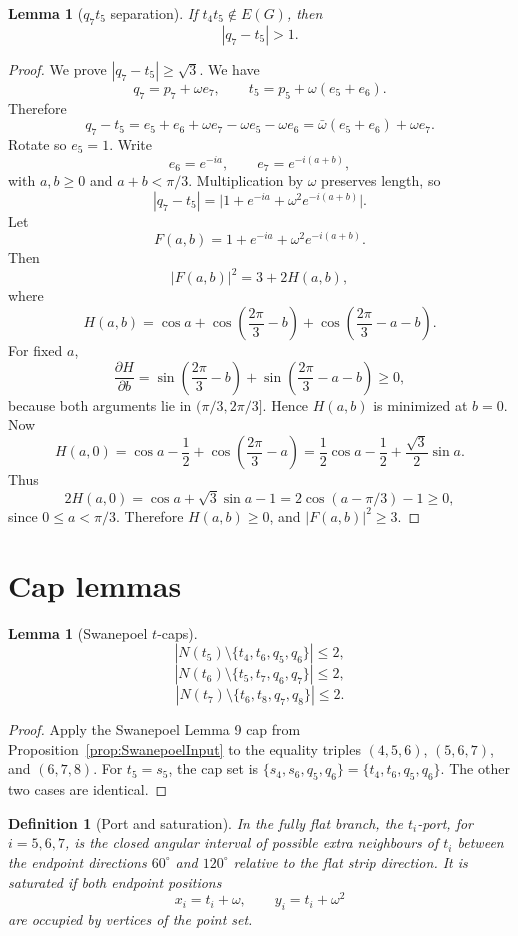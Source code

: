 \documentclass[11pt]{article}
\newtheorem{lemma}[theorem]{Lemma}
\newtheorem{definition}[theorem]{Definition}
\begin{document}
\begin{lemma}[$q_7t_5$ separation]\label{lem:q7t5}
If $t_4t_5\notin E(G)$, then
\[
 |q_7-t_5|>1.
\]
\end{lemma}

\begin{proof}
We prove $|q_7-t_5|\ge\sqrt3$. We have
\[
 q_7=p_7+\omega e_7,
\qquad
 t_5=p_5+\omega(e_5+e_6).
\]
Therefore
\[
 q_7-t_5=e_5+e_6+\omega e_7-\omega e_5-\omega e_6
          =\bar\omega(e_5+e_6)+\omega e_7.
\]
Rotate so $e_5=1$. Write
\[
 e_6=e^{-ia},
 \qquad
 e_7=e^{-i(a+b)},
\]
with $a,b\ge0$ and $a+b<\pi/3$. Multiplication by $\omega$ preserves length, so
\[
 |q_7-t_5|=\bigl|1+e^{-ia}+\omega^2e^{-i(a+b)}\bigr|.
\]
Let
\[
 F(a,b)=1+e^{-ia}+\omega^2e^{-i(a+b)}.
\]
Then
\[
 |F(a,b)|^2=3+2H(a,b),
\]
where
\[
 H(a,b)=\cos a+
 \cos\left(\frac{2\pi}{3}-b\right)+
 \cos\left(\frac{2\pi}{3}-a-b\right).
\]
For fixed $a$,
\[
 \frac{\partial H}{\partial b}=
 \sin\left(\frac{2\pi}{3}-b\right)+
 \sin\left(\frac{2\pi}{3}-a-b\right)\ge0,
\]
because both arguments lie in $(\pi/3,2\pi/3]$. Hence $H(a,b)$ is minimized at $b=0$.
Now
\[
 H(a,0)=\cos a-\frac12+
 \cos\left(\frac{2\pi}{3}-a\right)
 =\frac12\cos a-\frac12+\frac{\sqrt3}{2}\sin a.
\]
Thus
\[
 2H(a,0)=\cos a+\sqrt3\sin a-1
        =2\cos(a-\pi/3)-1\ge0,
\]
since $0\le a<\pi/3$. Therefore $H(a,b)\ge0$, and $|F(a,b)|^2\ge3$.
\end{proof}

\section{Cap lemmas}

\begin{lemma}[Swanepoel $t$-caps]\label{lem:t-caps}
\[
 |N(t_5)\setminus\{t_4,t_6,q_5,q_6\}|\le2,
\]
\[
 |N(t_6)\setminus\{t_5,t_7,q_6,q_7\}|\le2,
\]
\[
 |N(t_7)\setminus\{t_6,t_8,q_7,q_8\}|\le2.
\]
\end{lemma}

\begin{proof}
Apply the Swanepoel Lemma 9 cap from Proposition~\ref{prop:SwanepoelInput} to the equality triples $(4,5,6)$, $(5,6,7)$, and $(6,7,8)$. For $t_5=s_5$, the cap set is $\{s_4,s_6,q_5,q_6\}=\{t_4,t_6,q_5,q_6\}$. The other two cases are identical.
\end{proof}

\begin{definition}[Port and saturation]\label{def:port}
In the fully flat branch, the $t_i$-port, for $i=5,6,7$, is the closed angular interval of possible extra neighbours of $t_i$ between the endpoint directions $60^\circ$ and $120^\circ$ relative to the flat strip direction. It is saturated if both endpoint positions
\[
 x_i=t_i+\omega,
 \qquad
 y_i=t_i+\omega^2
\]
are occupied by vertices of the point set.
\end{definition}
\end{document}
